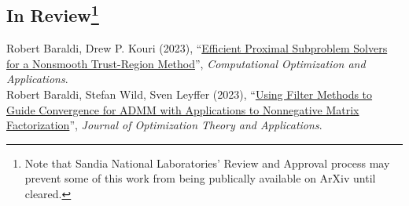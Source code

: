 \documentclass[11pt, a4paper]{article}
\newcommand{\years}[1]{\marginnote{#1}}
\begin{document}
\subsection*{In Review\footnote{\tiny Note that Sandia National Laboratories' Review and Approval process may prevent some of this work from being publically available on ArXiv until cleared. }}
\years{2023} Robert Baraldi, Drew P. Kouri (2023), ``\href{https://optimization-online.org/2023/11/efficient-proximal-subproblem-solvers-for-a-nonsmooth-trust-region-method/}{Efficient Proximal Subproblem Solvers for a Nonsmooth Trust-Region Method}'', \emph{Computational Optimization and Applications}. \\
\years{2023} Robert Baraldi, Stefan Wild, Sven Leyffer (2023), ``\href{https://optimization-online.org/2024/02/using-filter-methods-to-guide-convergence-for-admm-with-applications-to-nonnegative-matrix-factorization-problems/}{Using Filter Methods to Guide Convergence for ADMM with Applications to Nonnegative Matrix Factorization}'', \emph{Journal of Optimization Theory and Applications}.\\
\end{document}
